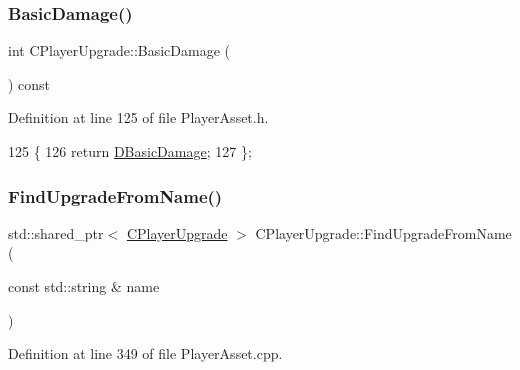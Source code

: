 \subsubsection{\texorpdfstring{Basic\+Damage()}{BasicDamage()}}
{\footnotesize\ttfamily int C\+Player\+Upgrade\+::\+Basic\+Damage (\begin{DoxyParamCaption}{ }\end{DoxyParamCaption}) const\hspace{0.3cm}{\ttfamily [inline]}}



Definition at line 125 of file Player\+Asset.\+h.


\begin{DoxyCode}
125                                \{
126             \textcolor{keywordflow}{return} \hyperlink{classCPlayerUpgrade_a914ae5e3de84921eaf060b5696478489}{DBasicDamage};  
127         \};
\end{DoxyCode}
\hypertarget{classCPlayerUpgrade_af47a08aba3a1a5b2cefacef24065a82e}{}\label{classCPlayerUpgrade_af47a08aba3a1a5b2cefacef24065a82e} 
\subsubsection{\texorpdfstring{Find\+Upgrade\+From\+Name()}{FindUpgradeFromName()}}
{\footnotesize\ttfamily std\+::shared\+\_\+ptr$<$ \hyperlink{classCPlayerUpgrade}{C\+Player\+Upgrade} $>$ C\+Player\+Upgrade\+::\+Find\+Upgrade\+From\+Name (\begin{DoxyParamCaption}\item[{const std\+::string \&}]{name }\end{DoxyParamCaption})\hspace{0.3cm}{\ttfamily [static]}}



Definition at line 349 of file Player\+Asset.\+cpp.



